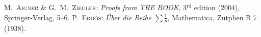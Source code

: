 \documentclass[12pt]{article}
\begin{document}
\begin{thebibliography}{2}
 \textsc{M.~Aigner \& G.~M.~Ziegler}: \emph{Proofs from THE BOOK}, 3\(^\mathrm{rd}\) edition (2004), Springer-Verlag, 5--6.
 \textsc{P.~Erd\H{o}s}: \emph{\"Uber die Reihe \(\sum\frac{1}{p}\)}, Mathematica, Zutphen B 7 (1938).
\end{thebibliography}
\end{document}
